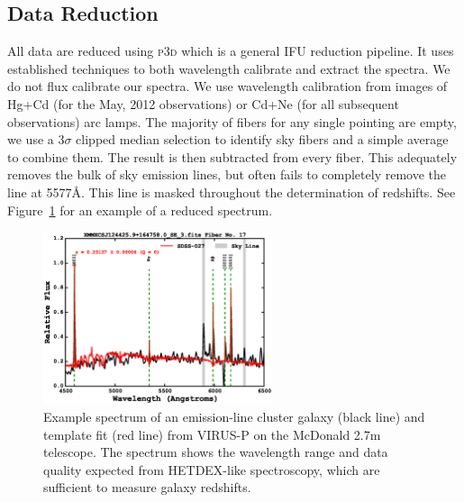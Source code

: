 \documentclass[12pt]{article}
\begin{document}
\subsection{Data Reduction}
\begin{outline}[enumerate]
	\1 All data are reduced using \textsc{p3d} \citep{Sandin2010} which is a general IFU reduction pipeline. It uses established techniques to both wavelength calibrate and extract the spectra. We do not flux calibrate our spectra.
	\1 We use wavelength calibration from images of Hg+Cd (for the May, 2012 observations) or Cd+Ne (for all subsequent observations) arc lamps.
	\1 The majority of fibers for any single pointing are empty, we use a $3\sigma$ clipped median selection to identify sky fibers and a simple average to combine them. The result is then subtracted from every fiber. This adequately removes the bulk of sky emission lines, but often fails to completely remove the  line at 5577\AA. This line is masked throughout the determination of redshifts. See Figure~\ref{fig:spectrum} for an example of a reduced spectrum.
		\begin{figure} 
			\includegraphics[width=0.6\textwidth]{./figures/spectrum.eps} 
			\caption{Example spectrum of an emission-line cluster galaxy (black line) and template fit (red line) from VIRUS-P on the McDonald 2.7m telescope. The spectrum shows the wavelength range and data quality expected from HETDEX-like spectroscopy, which are sufficient to measure galaxy redshifts.}
			\label{fig:spectrum} 
		\end{figure}
\end{outline}
\end{document}
